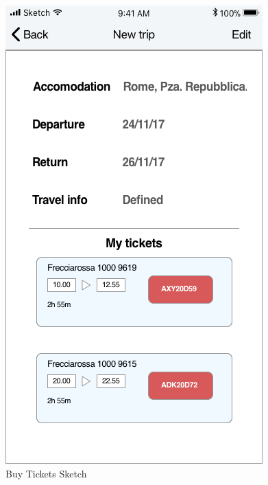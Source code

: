 \begin{figure}[H]
	\includegraphics[scale=0.23]{Images/Interface/Trips/15_trip_review}
	\caption{Buy Tickets Sketch}
\end{figure}